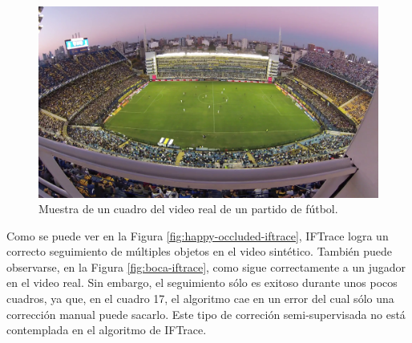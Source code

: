 \begin{figure}[H]
    \centering
    \includegraphics[width=\linewidth]{./images/sample_boca.png}
    \caption{Muestra de un cuadro del video real de un partido de fútbol.}
    \label{fig:sample-boca}
\end{figure}

Como se puede ver en la Figura
\ref{fig:happy-occluded-iftrace}, IFTrace logra un correcto seguimiento de múltiples objetos en el video sintético.
También puede observarse, en la Figura \ref{fig:boca-iftrace}, como sigue correctamente a un jugador en el video real.
Sin embargo, el seguimiento sólo es exitoso durante unos pocos cuadros, ya que, en el cuadro 17, el algoritmo cae en un error del
cual sólo una corrección manual
puede sacarlo. Este tipo de correción semi-supervisada no está contemplada en el algoritmo de IFTrace.

